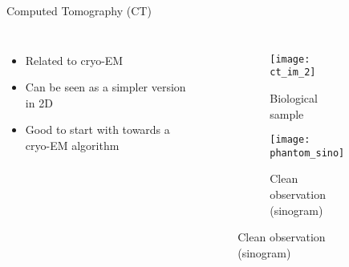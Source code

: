 

\begin{frame}[c]{Computed Tomography (CT)}
    \pause
    \begin{columns}[c]
            \begin{itemize}
                \item<2-> Related to cryo-EM
                \item<2-> Can be seen as a simpler version in 2D
                \item<2-> Good to start with towards a cryo-EM algorithm
            \end{itemize}
        
        \pause
        \begin{figure}
            \centering
            \begin{subfigure}[t]{0.45\textwidth}
                \texttt{[image: ct\_im\_2]}
                \caption{Biological sample}
            \end{subfigure}\hfill                
            \begin{subfigure}[t]{0.51\textwidth}
                \texttt{[image: phantom\_sino]}
                \caption{Clean observation (sinogram)}
            \end{subfigure}\hfill          
        \end{figure}

        
    \end{columns}
\end{frame}


